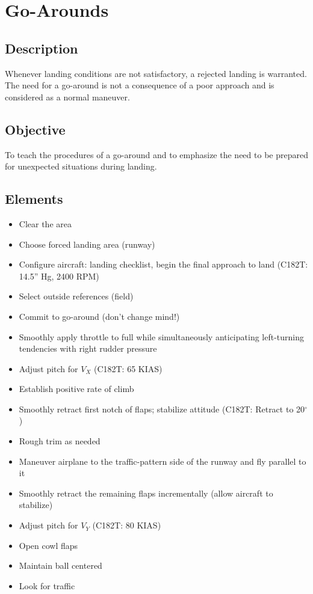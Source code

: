 \section{Go-Arounds}

\subsection{Description}

Whenever landing conditions are not satisfactory, a rejected landing is
warranted. The need for a go-around is not a consequence of a poor approach and
is considered as a normal maneuver.

\subsection{Objective}

To teach the procedures of a go-around and to emphasize the need to be prepared
for unexpected situations during landing.

\subsection{Elements}

\begin{itemize}
  \item Clear the area
  \item Choose forced landing area (runway)
  \item Configure aircraft: landing checklist, begin the final approach to land
    (C182T: 14.5'' Hg, 2400 RPM)
  \item Select outside references (field)
  \item Commit to go-around (don't change mind!) 
  \item Smoothly apply throttle to full while simultaneously anticipating
    left-turning tendencies with right rudder pressure 
  \item Adjust pitch for $V_X$ (C182T: 65 KIAS)
  \item Establish positive rate of climb
  \item Smoothly retract first notch of flaps; stabilize attitude (C182T:
    Retract to 20$^\circ$)
  \item Rough trim as needed
  \item Maneuver airplane to the traffic-pattern side of the runway and fly
    parallel to it
  \item Smoothly retract the remaining flaps incrementally (allow aircraft to
    stabilize)
  \item Adjust pitch for $V_Y$ (C182T: 80 KIAS)
  \item Open cowl flaps 
  \item Maintain ball centered
  \item Look for traffic
\end{itemize}

